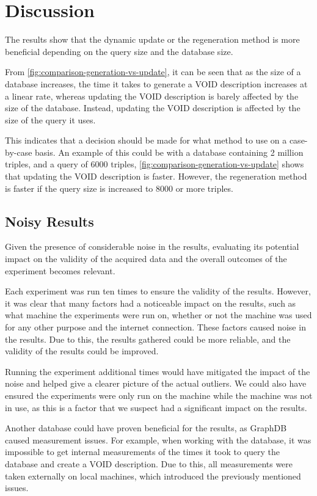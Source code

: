 \section{Discussion}\label{sec:discussion}
The results show that the dynamic update or the regeneration method is more beneficial depending on the query size and the database size.

From \autoref{fig:comparison-generation-vs-update}, it can be seen that as the size of a database increases, the time it takes to generate a VOID description increases at a linear rate, whereas updating the VOID description is barely affected by the size of the database. Instead, updating the VOID description is affected by the size of the query it uses.

This indicates that a decision should be made for what method to use on a case-by-case basis. An example of this could be with a database containing 2 million triples, and a query of 6000 triples, \autoref{fig:comparison-generation-vs-update} shows that updating the VOID description is faster. However, the regeneration method is faster if the query size is increased to 8000 or more triples.

\subsection{Noisy Results}\label{subsec:noisy-results}
Given the presence of considerable noise in the results, evaluating its potential impact on the validity of the acquired data and the overall outcomes of the experiment becomes relevant.

Each experiment was run ten times to ensure the validity of the results. However, it was clear that many factors had a noticeable impact on the results, such as what machine the experiments were run on, whether or not the machine was used for any other purpose and the internet connection. These factors caused noise in the results. Due to this, the results gathered could be more reliable, and the validity of the results could be improved.

Running the experiment additional times would have mitigated the impact of the noise and helped give a clearer picture of the actual outliers. We could also have ensured the experiments were only run on the machine while the machine was not in use, as this is a factor that we suspect had a significant impact on the results.

Another database could have proven beneficial for the results, as GraphDB caused measurement issues. For example, when working with the database, it was impossible to get internal measurements of the times it took to query the database and create a VOID description. Due to this, all measurements were taken externally on local machines, which introduced the previously mentioned issues.

